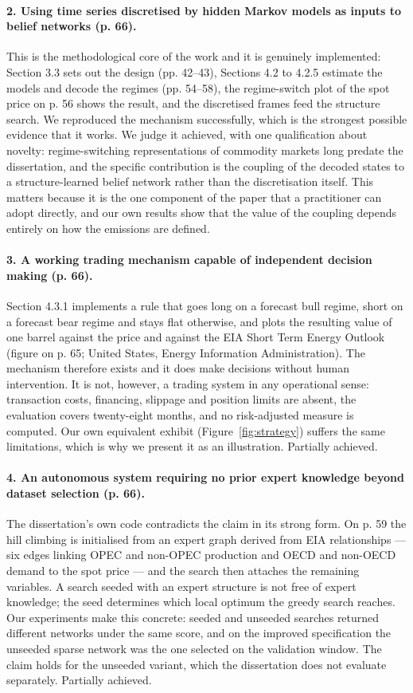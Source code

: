 \documentclass[11pt,a4paper]{article}
\begin{document}
\paragraph{2. Using time series discretised by hidden Markov models as inputs to belief networks
(p. 66).} This is the methodological core of the work and it is genuinely implemented: Section 3.3
sets out the design (pp. 42--43), Sections 4.2 to 4.2.5 estimate the models and decode the regimes
(pp. 54--58), the regime-switch plot of the spot price on p. 56 shows the result, and the
discretised frames feed the structure search. We reproduced the mechanism
successfully, which is the strongest possible evidence that it works. We judge it achieved, with
one qualification about novelty: regime-switching representations of commodity markets long
predate the dissertation, and the specific contribution is the coupling of the decoded states to a
structure-learned belief network rather than the discretisation itself. This matters because it is
the one component of the paper that a practitioner can adopt directly, and our own results show
that the value of the coupling depends entirely on how the emissions are defined.

\paragraph{3. A working trading mechanism capable of independent decision making (p. 66).}
Section 4.3.1 implements a rule that goes long on a forecast bull regime, short on a forecast bear
regime and stays flat otherwise, and plots the resulting value of one barrel against the price and
against the EIA Short Term Energy Outlook (figure on p. 65; United States, Energy Information
Administration). The mechanism therefore exists and it does
make decisions without human intervention. It is not, however, a trading system in any operational
sense: transaction costs, financing, slippage and position limits are absent, the evaluation covers
twenty-eight months, and no risk-adjusted measure is computed. Our own equivalent exhibit
(Figure~\ref{fig:strategy}) suffers the same limitations, which is why we present it as an
illustration. Partially achieved.

\paragraph{4. An autonomous system requiring no prior expert knowledge beyond dataset selection
(p. 66).} The dissertation's own code contradicts the claim in its strong form. On p. 59 the hill
climbing is initialised from an expert graph derived from EIA relationships --- six edges linking
OPEC and non-OPEC production and OECD and non-OECD demand to the spot price --- and the search then
attaches the remaining variables. A search seeded with an expert structure is not free of expert
knowledge; the seed determines which local optimum the greedy search reaches. Our experiments make
this concrete: seeded and unseeded searches returned different networks under the same score, and
on the improved specification the unseeded sparse network was the one selected on the validation
window. The claim holds for the unseeded variant, which the dissertation does not evaluate
separately. Partially achieved.
\end{document}
